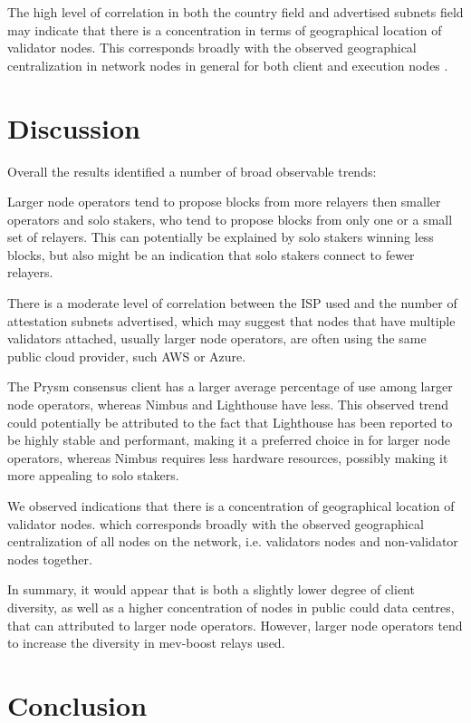 \documentclass[conference]{IEEEtran}
\begin{document}
The high level of correlation in both the country field and advertised subnets field may indicate that there is a concentration in terms of geographical location of validator nodes.  This corresponds broadly with the observed geographical centralization in network nodes in general for both client and execution nodes \cite{nodewatch2024}.

\section{Discussion}

Overall the results identified a number of broad observable trends:

Larger node operators tend to propose blocks from more relayers then smaller operators and solo stakers, who tend to propose blocks from only one or a small set of relayers.  This can potentially be explained by solo stakers winning less blocks, but also might be an indication that solo stakers connect to fewer relayers.

There is a moderate level of correlation between the ISP used and the number of attestation subnets advertised, which may suggest that nodes that have multiple validators attached, usually larger node operators, are often using the same public cloud provider, such AWS or Azure.

The Prysm consensus client has a larger average percentage of use among larger node operators, whereas Nimbus and Lighthouse have less. This observed trend could potentially be attributed to the fact that Lighthouse has been reported to be highly stable and performant, making it a preferred choice in for larger node operators, whereas Nimbus requires less hardware resources, possibly making it more appealing to solo stakers.

We observed indications that there is a concentration of geographical location of validator nodes. which corresponds broadly with the observed geographical centralization of all nodes on the network, i.e. validators nodes and non-validator nodes together.

In summary, it would appear that is both a slightly lower degree of client diversity, as well as a higher concentration of nodes in public could data centres, that can attributed to larger node operators.  However, larger node operators tend to increase the diversity in mev-boost relays used.

\section{Conclusion}
\end{document}
